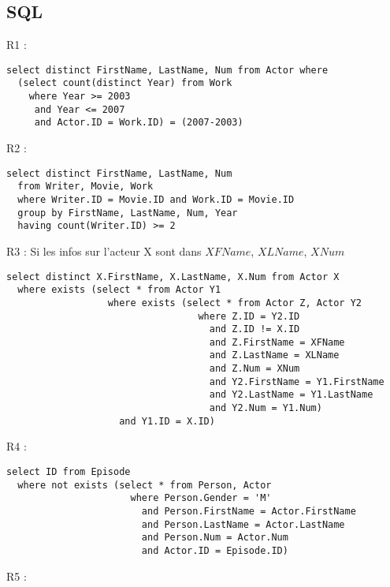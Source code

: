 \documentclass[a4paper,12pt]{article}
\begin{document}
\subsection{SQL}
\begin{list}{-}{}
  \item R1 :
    \begin{lstlisting}
select distinct FirstName, LastName, Num from Actor where
  (select count(distinct Year) from Work
    where Year >= 2003
     and Year <= 2007
     and Actor.ID = Work.ID) = (2007-2003)
    \end{lstlisting}
  \item R2 :
    \begin{lstlisting}
select distinct FirstName, LastName, Num
  from Writer, Movie, Work
  where Writer.ID = Movie.ID and Work.ID = Movie.ID
  group by FirstName, LastName, Num, Year
  having count(Writer.ID) >= 2
    \end{lstlisting}
  \item R3 :
    Si les infos sur l'acteur X sont dans $XFName$, $XLName$, $XNum$
    \begin{lstlisting}
select distinct X.FirstName, X.LastName, X.Num from Actor X
  where exists (select * from Actor Y1
                  where exists (select * from Actor Z, Actor Y2 
                                  where Z.ID = Y2.ID
                                    and Z.ID != X.ID
                                    and Z.FirstName = XFName
                                    and Z.LastName = XLName
                                    and Z.Num = XNum
                                    and Y2.FirstName = Y1.FirstName
                                    and Y2.LastName = Y1.LastName
                                    and Y2.Num = Y1.Num)
                    and Y1.ID = X.ID)
    \end{lstlisting}
  \item R4 :
    \begin{lstlisting}
select ID from Episode
  where not exists (select * from Person, Actor
                      where Person.Gender = 'M'
                        and Person.FirstName = Actor.FirstName
                        and Person.LastName = Actor.LastName
                        and Person.Num = Actor.Num
                        and Actor.ID = Episode.ID)
    \end{lstlisting}
  \item R5 :

\end{list}
\end{document}
